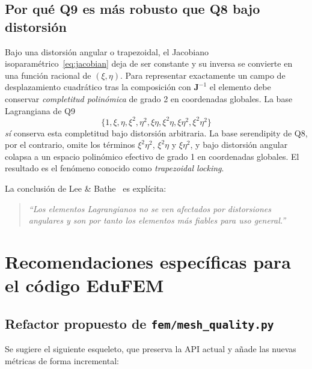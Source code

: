 \documentclass[11pt,a4paper]{article}
\begin{document}
\subsection{Por qu\'e Q9 es m\'as robusto que Q8 bajo distorsi\'on}
Bajo una distorsi\'on angular o trapezoidal, el Jacobiano isoparam\'etrico~\eqref{eq:jacobian} deja de ser constante y su inversa se convierte en una funci\'on racional de $(\xi,\eta)$. Para representar exactamente un campo de desplazamiento cuadr\'atico tras la composici\'on con $\mathbf{J}^{-1}$ el elemento debe conservar \emph{completitud polin\'omica} de grado 2 en coordenadas globales. La base Lagrangiana de Q9
\[
\{1,\xi,\eta,\xi^2,\eta^2,\xi\eta,\xi^2\eta,\xi\eta^2,\xi^2\eta^2\}
\]
\emph{s\'i} conserva esta completitud bajo distorsi\'on arbitraria. La base serendipity de Q8, por el contrario, omite los t\'erminos $\xi^2\eta^2$, $\xi^2\eta$ y $\xi\eta^2$, y bajo distorsi\'on angular colapsa a un espacio polin\'omico efectivo de grado 1 en coordenadas globales. El resultado es el fen\'omeno conocido como \emph{trapezoidal locking}.

La conclusi\'on de Lee \& Bathe~\cite{LeeBathe1993} es expl\'icita:
\begin{quote}
\emph{``Los elementos Lagrangianos no se ven afectados por distorsiones angulares y son por tanto los elementos m\'as fiables para uso general.''}
\end{quote}

\section{Recomendaciones espec\'ificas para el c\'odigo EduFEM}
\label{sec:recs}

\subsection{Refactor propuesto de \texttt{fem/mesh\_quality.py}}

Se sugiere el siguiente esqueleto, que preserva la API actual y a\~nade las nuevas m\'etricas de forma incremental:
\end{document}
